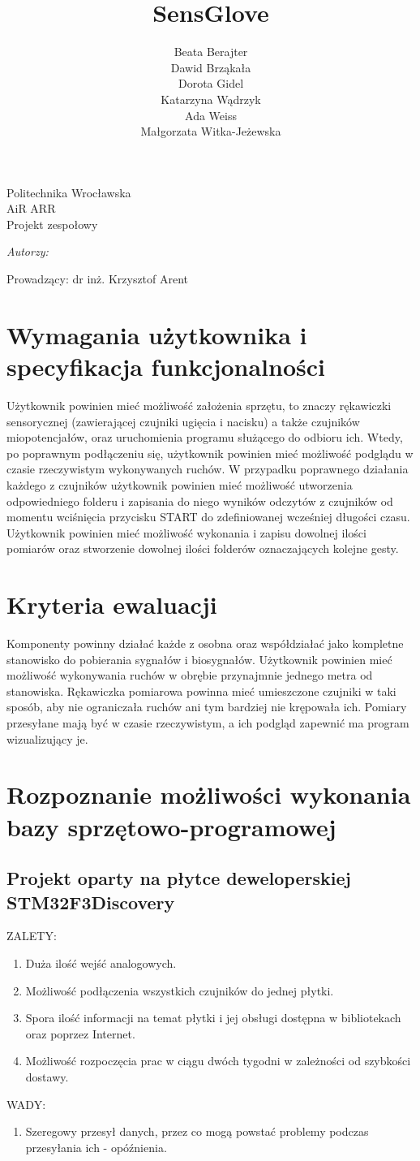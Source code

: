 \documentclass{article}
\author{Beata Berajter\\
Dawid Brząkała\\
Dorota Gidel\\
Katarzyna Wądrzyk\\
Ada Weiss\\
Małgorzata Witka-Jeżewska\\
 }
\title{SensGlove}
\makeatletter
\renewcommand{\maketitle}{\begin{titlepage}
    \vspace*{1cm}
    \begin{center}
    Politechnika Wrocławska\\
    AiR ARR\\
 Projekt zespołowy
    \end{center}
      \vspace{3cm}
    \begin{center}

     \LARGE \textsc {\@title}
         \end{center}
     \vspace{1cm}

    \begin{center}
    \textit{ Autorzy:}\\
   \textit{\@author}
     \end{center}
      \vspace{1cm}

     \begin{center}

    Prowadzący:
  dr inż. Krzysztof Arent
    \end{center}

    \vspace*{\stretch{6}}
    \begin{center}
    \@date
    \end{center}
  \end{titlepage}
}
\makeatother
\begin{document}
\maketitle
\newpage
\tableofcontents
\newpage


\section{Wymagania użytkownika i specyfikacja funkcjonalności}
Użytkownik powinien mieć możliwość założenia sprzętu, to znaczy rękawiczki sensorycznej (zawierającej czujniki ugięcia i nacisku) a także czujników miopotencjałów, oraz uruchomienia programu służącego do odbioru ich. Wtedy, po poprawnym podłączeniu się, użytkownik powinien mieć możliwość podglądu w czasie rzeczywistym wykonywanych ruchów. W przypadku poprawnego działania każdego z czujników użytkownik powinien mieć możliwość utworzenia odpowiedniego folderu i zapisania do niego wyników odczytów z czujników od momentu wciśnięcia przycisku START do zdefiniowanej wcześniej długości czasu. Użytkownik powinien mieć możliwość wykonania i zapisu dowolnej ilości pomiarów oraz stworzenie dowolnej ilości folderów oznaczających kolejne gesty.

\section{Kryteria ewaluacji}
Komponenty powinny działać każde z osobna oraz współdziałać jako kompletne stanowisko do pobierania sygnałów i biosygnałów. Użytkownik powinien mieć możliwość wykonywania ruchów w obrębie przynajmnie jednego metra od stanowiska. Rękawiczka pomiarowa powinna mieć umieszczone czujniki w taki sposób, aby nie ograniczała ruchów ani tym bardziej nie krępowała ich. Pomiary przesyłane mają być w czasie rzeczywistym, a ich podgląd zapewnić ma program wizualizujący je.

\section{Rozpoznanie możliwości wykonania bazy sprzętowo-programowej}

\subsection{Projekt oparty na płytce deweloperskiej STM32F3Discovery}
ZALETY:
\begin{enumerate}
    \item Duża ilość wejść analogowych.
\item Możliwość podłączenia wszystkich czujników do jednej płytki.
    \item Spora ilość informacji na temat płytki i jej obsługi dostępna w bibliotekach oraz poprzez Internet.
\item Możliwość rozpoczęcia prac w ciągu dwóch tygodni w zależności od szybkości dostawy.
\end{enumerate}
WADY:
\begin{enumerate}
    \item Szeregowy przesył danych, przez co mogą powstać problemy podczas przesyłania ich - opóźnienia.
\end{enumerate}
\end{document}
